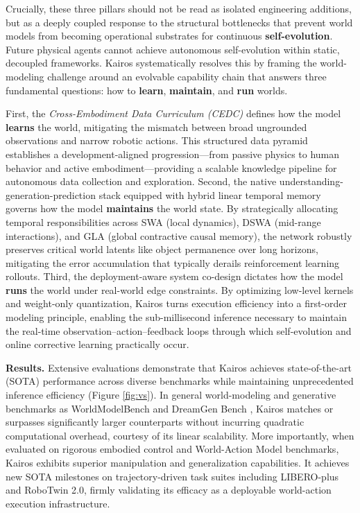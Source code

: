 \documentclass{llmxive}
\begin{document}
\begin{itemize}
    
\end{itemize}















Crucially, these three pillars should not be read as isolated engineering additions, but as a deeply coupled response to the structural bottlenecks that prevent world models from becoming operational substrates for continuous \textbf{self-evolution}. Future physical agents cannot achieve autonomous self-evolution within static, decoupled frameworks. Kairos systematically resolves this by framing the world-modeling challenge around an evolvable capability chain that answers three fundamental questions: how to \textbf{learn}, \textbf{maintain}, and \textbf{run} worlds. 

First, the \textit{Cross-Embodiment Data Curriculum (CEDC)} defines how the model \textbf{learns} the world, mitigating the mismatch between broad ungrounded observations and narrow robotic actions. This structured data pyramid establishes a development-aligned progression—from passive physics to human behavior and active embodiment—providing a scalable knowledge pipeline for autonomous data collection and exploration. Second, the native understanding-generation-prediction stack equipped with hybrid linear temporal memory governs how the model \textbf{maintains} the world state. By strategically allocating temporal responsibilities across SWA (local dynamics), DSWA (mid-range interactions), and GLA (global contractive causal memory), the network robustly preserves critical world latents like object permanence over long horizons, mitigating the error accumulation that typically derails reinforcement learning rollouts. Third, the deployment-aware system co-design dictates how the model \textbf{runs} the world under real-world edge constraints. By optimizing low-level kernels and weight-only quantization, Kairos turns execution efficiency into a first-order modeling principle, enabling the sub-millisecond inference necessary to maintain the real-time observation–action–feedback loops through which self-evolution and online corrective learning practically occur.

\textbf{Results.} Extensive evaluations demonstrate that Kairos achieves state-of-the-art (SOTA) performance across diverse benchmarks while maintaining unprecedented inference efficiency (Figure \ref{fig:vs}). In general world-modeling and generative benchmarks as WorldModelBench \cite{li2025worldmodelbench} and DreamGen Bench \cite{fan2025dreamgen}, Kairos matches or surpasses significantly larger counterparts without incurring quadratic computational overhead, courtesy of its linear scalability. More importantly, when evaluated on rigorous embodied control and World-Action Model benchmarks, Kairos exhibits superior manipulation and generalization capabilities. It achieves new SOTA milestones on trajectory-driven task suites including LIBERO-plus and RoboTwin 2.0, firmly validating its efficacy as a deployable world-action execution infrastructure.
\end{document}

